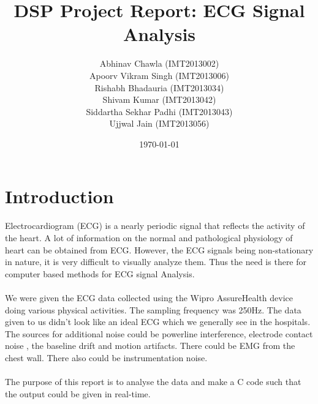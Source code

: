 \documentclass{article}
\title{DSP Project Report: ECG Signal Analysis}
\author{Abhinav Chawla (IMT2013002) \\ Apoorv Vikram Singh (IMT2013006) \\ Rishabh Bhadauria (IMT2013034) \\ Shivam Kumar (IMT2013042) \\Siddartha Sekhar Padhi (IMT2013043) \\ Ujjwal Jain (IMT2013056) }
\date{\today}
\begin{document}
\maketitle

\section{Introduction}
Electrocardiogram (ECG) is a nearly periodic signal that reflects the activity of the
heart. A lot of information on the normal and pathological physiology of heart can be
obtained from ECG. However, the ECG signals being non-stationary in nature, it is very
difficult to visually analyze them. Thus the need is there for computer based methods for
ECG signal Analysis. \\ \\
We were given the ECG data collected using the Wipro AssureHealth device doing
various physical activities. The sampling frequency was 250Hz. The data given to
us didn't look like an ideal ECG which we generally see in the hospitals. The
sources for additional noise could be powerline interference, electrode contact
noise , the baseline drift and motion artifacts. There could be EMG from the
chest wall. There also could be instrumentation noise. \\ \\
The purpose of this report is to analyse the data and make a C code such that
the output could be given in real-time. 
\end{document}
